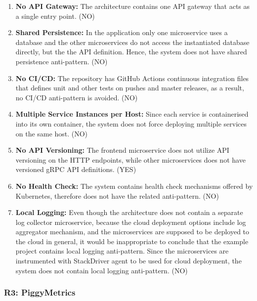 \documentclass{Configuration_Files/PoliMi3i_thesis}
\begin{document}
\begin{enumerate}
    \item \textbf{No API Gateway:} The architecture contains one API gateway that acts as a single entry point. (NO)
    
    \item \textbf{Shared Persistence:} In the application only one microservice uses a database and the other microservices do not access the instantiated database directly, but the the API definition.
    Hence, the system does not have shared persistence anti-pattern. (NO)
    
    \item \textbf{No CI/CD:} The repository has GitHub Actions continuous integration files that defines unit and other tests on pushes and master releases, as a result, no CI/CD anti-pattern is avoided. (NO)
    
    \item \textbf{Multiple Service Instances per Host:} Since each service is containerised into its own container, the system does not force deploying multiple services on the same host. (NO)
    
    \item \textbf{No API Versioning:} The frontend microservice does not utilize API versioning on the HTTP endpoints, while other microservices does not have versioned gRPC API definitions. (YES)
    
    \item \textbf{No Health Check:} The system contains health check mechanisms offered by Kubernetes, therefore does not have the related anti-pattern. (NO)
    
    \item \textbf{Local Logging:} Even though the architecture does not contain a separate log collector microservice, because the cloud deployment options include log aggregator mechanism, and the microservices are supposed to be deployed to the cloud in general, it would be inappropriate to conclude that the example project contains local logging anti-pattern.
    Since the microservices are instrumented with StackDriver agent to be used for cloud deployment, the system does not contain local logging anti-pattern. (NO)
\end{enumerate}

\subsubsection{R3: PiggyMetrics}
\label{subsubsec:R3}
\end{document}
